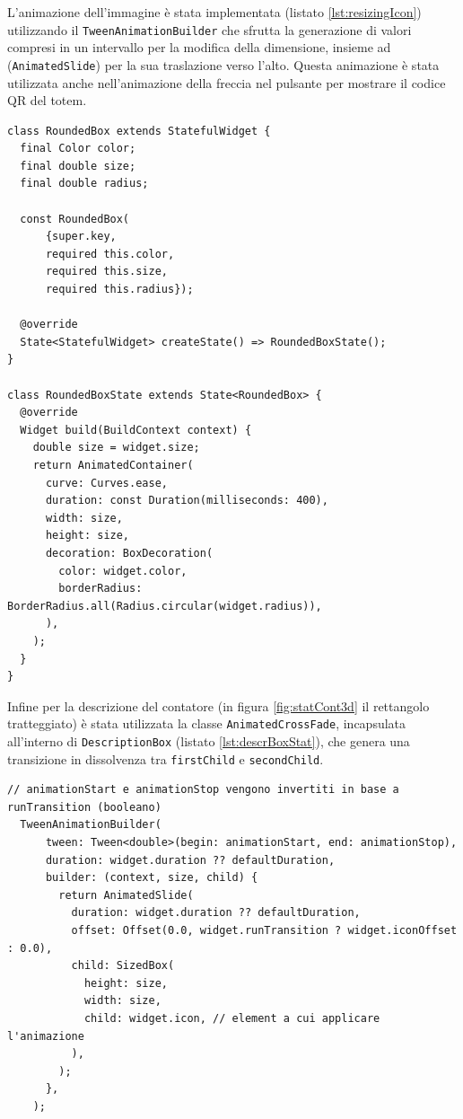 L'animazione dell'immagine è stata implementata (listato \ref{lst:resizingIcon}) utilizzando il \texttt{TweenAnimationBuilder} che sfrutta la generazione di valori compresi in un intervallo per la modifica della dimensione, insieme ad (\texttt{AnimatedSlide}) per la sua traslazione verso l'alto. Questa animazione è stata utilizzata anche nell'animazione della freccia nel pulsante per mostrare il codice QR del totem.

\vspace{\baselineskip}
\begin{lstlisting}[style=FlutterStyle, caption={Classe RoundedBox usata nella creazione del contatore delle statistiche}, label={lst:roundedBox}]
class RoundedBox extends StatefulWidget {
  final Color color;
  final double size;
  final double radius;

  const RoundedBox(
      {super.key,
      required this.color,
      required this.size,
      required this.radius});

  @override
  State<StatefulWidget> createState() => RoundedBoxState();
}

class RoundedBoxState extends State<RoundedBox> {
  @override
  Widget build(BuildContext context) {
    double size = widget.size;
    return AnimatedContainer(
      curve: Curves.ease,
      duration: const Duration(milliseconds: 400),
      width: size,
      height: size,
      decoration: BoxDecoration(
        color: widget.color,
        borderRadius: BorderRadius.all(Radius.circular(widget.radius)),
      ),
    );
  }
}
\end{lstlisting}
%
Infine per la descrizione del contatore (in figura \ref{fig:statCont3d} il rettangolo tratteggiato) è stata utilizzata la classe \texttt{AnimatedCrossFade}, incapsulata all'interno di \texttt{DescriptionBox} (listato \ref{lst:descrBoxStat}), che genera una transizione in dissolvenza tra \texttt{firstChild} e \texttt{secondChild}.
%
\vspace{\baselineskip}
\begin{lstlisting}[style=FlutterStyle, caption={Classe \texttt{ResizingIcon} che utilizza il \texttt{TweenAnimationBuilder}.}, label={lst:resizingIcon}]
  // animationStart e animationStop vengono invertiti in base a runTransition (booleano)
  TweenAnimationBuilder(
      tween: Tween<double>(begin: animationStart, end: animationStop),
      duration: widget.duration ?? defaultDuration,
      builder: (context, size, child) {
        return AnimatedSlide(
          duration: widget.duration ?? defaultDuration,
          offset: Offset(0.0, widget.runTransition ? widget.iconOffset : 0.0),
          child: SizedBox(
            height: size,
            width: size,
            child: widget.icon, // element a cui applicare l'animazione
          ),
        );
      },
    );
\end{lstlisting}
